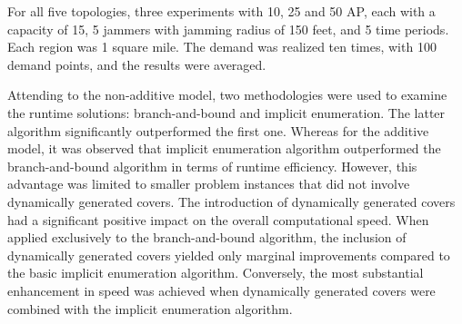 \documentclass[runningheads]{llncs}
\begin{document}
	
	
	For all five topologies, three experiments with 10, 25 and 50 AP, each with a capacity of 15, 5 jammers with jamming radius of 150 feet, and 5 time periods. Each region was 1 square mile. The demand was realized ten times, with 100 demand points, and the results were averaged.
	
	
	Attending to the non-additive model, two methodologies were used to examine the runtime solutions: branch-and-bound and implicit enumeration. The latter algorithm significantly outperformed the first one. Whereas for the additive model, it was observed that implicit enumeration algorithm outperformed the branch-and-bound algorithm in terms of runtime efficiency. However, this advantage was limited to smaller problem instances that did not involve dynamically generated covers. The introduction of dynamically generated covers had a significant positive impact on the overall computational speed. When applied exclusively to the branch-and-bound algorithm, the inclusion of dynamically generated covers yielded only marginal improvements compared to the basic implicit enumeration algorithm. Conversely, the most substantial enhancement in speed was achieved when dynamically generated covers were combined with the implicit enumeration algorithm.
	
\end{document}

